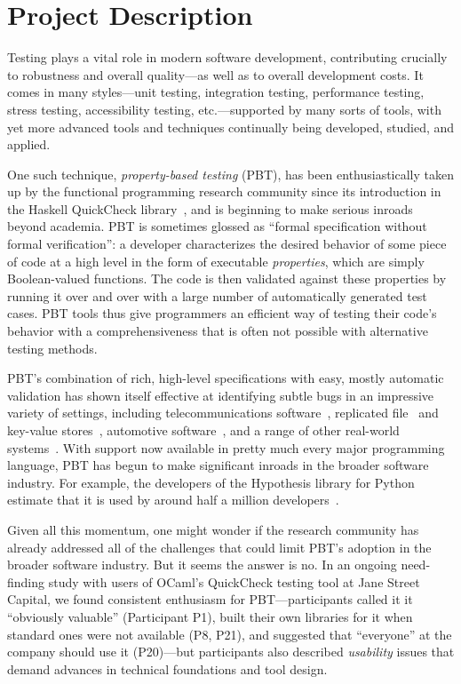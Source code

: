 \section*{Project Description}

Testing plays a vital role in modern software development,
contributing crucially to robustness and overall quality---as well as
to overall development costs.
%
It comes in many styles---unit testing, integration testing,
performance testing, stress testing, accessibility testing,
etc.---supported by many sorts of tools, with yet more advanced tools
and techniques continually being developed, studied, and applied.

One such technique, {\em property-based testing} (PBT), has been
enthusiastically taken up by the functional programming research
community since its introduction in the Haskell QuickCheck
library~\cite{ClaessenHughes00}, and is beginning to make
serious inroads beyond academia.
%
PBT is sometimes glossed as ``formal specification without formal
verification'': a developer characterizes the desired behavior of
some piece of code at a high level in the form of executable {\em
  properties}, which are simply Boolean-valued functions. The code is
then validated against these properties by running it over and over
with a large number of automatically generated test cases.
%
PBT tools thus give programmers an efficient way of testing their
code's behavior with a comprehensiveness that is often not
possible with alternative testing methods.

PBT's combination of rich, high-level specifications with easy, mostly
automatic validation has shown itself effective at identifying subtle
bugs in an impressive variety of settings, including telecommunications
software~\cite{arts2006testing}, replicated
file~\cite{hughes2014mysteries} and key-value
stores~\cite{Bornholt2021}, automotive software~\cite{arts2015testing}, and a range
of other real-world systems~\cite{hughes2016experiences}. With support
now available in pretty much every major programming language, PBT has
begun to make significant inroads in the broader software
industry. For example, the developers of the Hypothesis library for
Python estimate that it is used by around half a million
developers~\cite{ZacPersonalCommunication}.

\newcommand{\participant}[1]{{P#1}}

Given all this momentum, one might wonder if the research community has
already
addressed all of the challenges that could limit PBT's adoption
in the broader software industry.  But it
seems the answer is no.
In an ongoing need-finding study with users of OCaml's QuickCheck testing tool
at Jane Street Capital, we found
consistent enthusiasm for PBT---participants called it it
``obviously valuable'' (Participant \participant{1}),
built their own libraries for it when standard ones were not available
(\participant{8},
\participant{21}), and suggested that ``everyone'' at the company should use it
(\participant{20})---but participants also described {\em usability} issues
that demand advances in technical foundations and
tool design.

